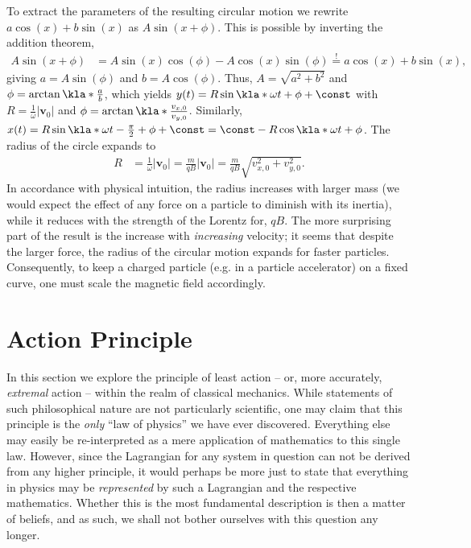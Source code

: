 \documentclass[english, parskip=full]{scrartcl}
\begin{document}
To extract the parameters of the resulting circular motion we rewrite $a\cos(x) + b\sin(x)$ as $A\sin(x+\phi)$.
This is possible by inverting the addition theorem,
\begin{align}
A\sin(x+\phi) &= A\sin(x) \cos(\phi) - A\cos(x) \sin(\phi) \overset{!}{=} a\cos(x) + b\sin(x),
\end{align}
giving $a=A\sin(\phi)$ and $b=A\cos(\phi)$.
Thus, $A=\sqrt{a^2+b^2}$ and $\phi = \arctan\kla*{\frac{a}{b}}$, which yields
$y(t) = R\sin\kla*{\omega t + \phi} + \const$ with $R = \frac{1}{\omega} |\textbf{v}_0|$ and $\phi = \arctan\kla*{\frac{v_{x,0}}{v_{y,0}}}$.
Similarly, $x(t) = R\sin\kla*{\omega t - \frac{\pi}{2} +\phi} + \const = \const - R\cos\kla*{\omega t + \phi}$.
The radius of the circle expands to
\begin{align}
R &= \frac{1}{\omega} |\textbf{v}_0| = \frac{m}{qB} |\textbf{v}_0| = \frac{m}{qB} \sqrt{v_{x,0}^2 + v_{y,0}^2}.
\end{align}
In accordance with physical intuition, the radius increases with larger mass (we would expect the effect of any force on a particle to diminish with its inertia), while it reduces with the strength of the Lorentz for, $qB$.
The more surprising part of the result is the increase with \emph{increasing} velocity; it seems that despite the larger force, the radius of the circular motion expands for faster particles.
Consequently, to keep a charged particle (e.g. in a particle accelerator) on a fixed curve, one must scale the magnetic field accordingly.
\section{Action Principle}
In this section we explore the principle of least action -- or, more accurately, \emph{extremal} action -- within the realm of classical mechanics.
While statements of such philosophical nature are not particularly scientific, one may claim that this principle is the \emph{only} ``law of physics'' we have ever discovered.
Everything else may easily be re-interpreted as a mere application of mathematics to this single law.
However, since the Lagrangian for any system in question can not be derived from any higher principle, it would perhaps be more just to state that everything in physics may be \emph{represented} by such a Lagrangian and the respective mathematics.
Whether this is the most fundamental description is then a matter of beliefs, and as such, we shall not bother ourselves with this question any longer.
\end{document}
